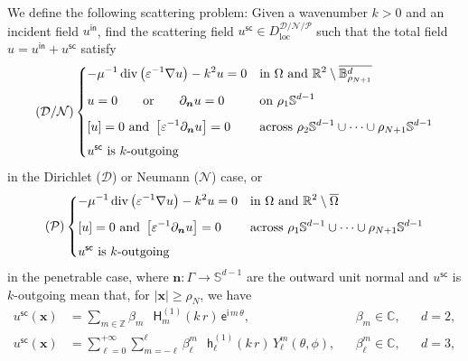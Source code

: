 \documentclass[12pt,a4paper]{article}
\theoremstyle{definition}
\theoremstyle{plain}
\theoremstyle{remark}
\newcommand{\bbB}{\mathbb{B}}
\newcommand{\bbC}{\mathbb{C}}
\newcommand{\bbR}{\mathbb{R}}
\newcommand{\bbS}{\mathbb{S}}
\newcommand{\bbZ}{\mathbb{Z}}
\newcommand{\calD}{\mathcal{D}}
\newcommand{\calN}{\mathcal{N}}
\newcommand{\calP}{\mathcal{P}}
\newcommand{\ex}{\mathsf{e}}
\newcommand{\im}{\mathsf{i}}
\newcommand{\Hu}{\mathop{}\!\mathsf{H}^{(1)}}
\newcommand{\hu}{\mathop{}\!\mathsf{h}^{(1)}}
\DeclareMathOperator{\Div}{div}
\newcommand{\plr}[1]{\left(#1\right)}
\newcommand{\clr}[1]{\left[#1\right]}
\newcommand{\vect}[1]{\boldsymbol{#1}}
\newcommand{\vx}{\boldsymbol{x}}
\newcommand{\eps}{\varepsilon}
\newcommand{\loc}{\mathrm{loc}}
\newcommand{\inc}{\mathsf{in}}
\newcommand{\sca}{\mathsf{sc}}
\begin{document}
We define the following scattering problem: Given a wavenumber \(k > 0\) and an incident field \(u^\inc\), find the scattering field \(u^\sca \in D_\loc^{\calD/\calN/\calP}\) such that the total field \(u = u^\inc + u^\sca\) satisfy
\begin{equation}\label{eq:scat_pde_im}
    (\calD / \calN)\begin{dcases}
        -\mu^{-1}\Div\plr{\eps^{-1} \nabla u} - k^2 u = 0                   & \text{in } \Omega \text{ and } \bbR^2 \setminus \overline{\bbB_{\rho_{N+1}}^d} \\[1ex]
        u = 0 \qquad \text{or} \qquad \partial_{\vect{n}}u = 0              & \text{on } \rho_1\bbS^{d-1}                                                    \\[1ex]
        \clr{u} = 0 \ \text{and}\ \clr{\eps^{-1} \partial_{\vect{n}} u} = 0 & \text{across } \rho_2\bbS^{d-1} \cup \cdots \cup \rho_{N+1}\bbS^{d-1}          \\[1ex]
        \text{$u^\sca$ is \(k\)-outgoing}
    \end{dcases}
\end{equation}
in the Dirichlet ($\calD$) or Neumann ($\calN$) case, or
\begin{equation}\label{eq:scat_pde}
    (\calP)\begin{dcases}
        -\mu^{-1}\Div\plr{\eps^{-1} \nabla u} - k^2 u = 0                   & \text{in } \Omega \text{ and } \bbR^2 \setminus \overline{\Omega}     \\[1ex]
        \clr{u} = 0 \ \text{and}\ \clr{\eps^{-1} \partial_{\vect{n}} u} = 0 & \text{across } \rho_1\bbS^{d-1} \cup \cdots \cup \rho_{N+1}\bbS^{d-1} \\[1ex]
        \text{$u^\sca$ is \(k\)-outgoing}
    \end{dcases}
\end{equation}
in the penetrable case, where \(\vect{n} : \Gamma \to \bbS^{d-1}\) are the outward unit normal and \(u^\sca\) is \(k\)-outgoing mean that, for \(|\vx| \ge \rho_N\), we have
\begin{subequations}\label{eq:OWC}
    \begin{align}
        u^\sca(\vx)
         & = \sum_{m \in \bbZ} \beta_m\, \Hu_m(k\, r)\, \ex^{\im\, m\, \theta},
         &                                                                                                           & \beta_m \in \bbC,
         &                                                                                                           & d = 2,                 \\
        u^\sca(\vx)
         & = \sum_{\ell = 0}^{+\infty} \sum_{m = -\ell}^\ell \beta_\ell^m\, \hu_\ell(k\, r)\, Y_\ell^m(\theta,\phi),
         &                                                                                                           & \beta_\ell^m \in \bbC,
         &                                                                                                           & d = 3,
    \end{align}
\end{subequations}
\end{document}
